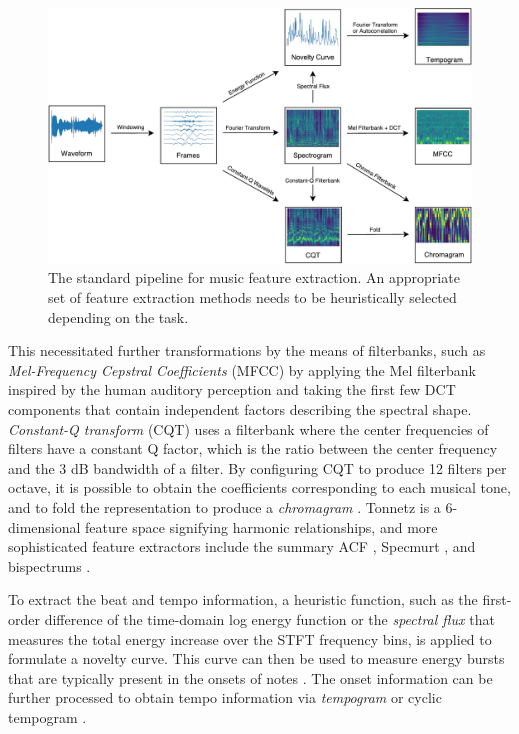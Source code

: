 \begin{figure}[t]
	\includegraphics[width=\textwidth]{pipeline.pdf}
	\caption{\small The standard pipeline for music feature extraction. An appropriate set of feature extraction methods needs to be heuristically selected depending on the task.}\label{fig:pipeline}
\end{figure}

This necessitated further transformations by the means of filterbanks, such as \emph{Mel-Frequency Cepstral Coefficients} (MFCC) \cite{logan2000mfcc} by applying the Mel filterbank inspired by the human auditory perception and taking the first few DCT components that contain independent factors describing the spectral shape.
\emph{Constant-Q transform} (CQT) \cite{schorkhuber2010cqt} uses a filterbank where the center frequencies of filters have a constant Q factor, which is the ratio between the center frequency and the 3 dB bandwidth of a filter.
By configuring CQT to produce 12 filters per octave, it is possible to obtain the coefficients corresponding to each musical tone, and to fold the representation to produce a \emph{chromagram} \cite{harte2005chromagram}.
Tonnetz \cite{harte2006tonnetz} is a 6-dimensional feature space signifying harmonic relationships, and more sophisticated feature extractors include the summary ACF \cite{tolonen2000multipitch}, Specmurt \cite{saito2008specmurt}, and bispectrums \cite{argenti2011bispectral}.


To extract the beat and tempo information, a heuristic function, such as the first-order difference of the time-domain log energy function or the \emph{spectral flux} that measures the total energy increase over the STFT frequency bins, is applied to formulate a novelty curve.
This curve can then be used to measure energy bursts that are typically present in the onsets of notes \cite{bello2005onset}.
The onset information can be further processed to obtain tempo information via \emph{tempogram} \cite{cemgil2000tempogram} or cyclic tempogram \cite{grosche2010tempogram}.

